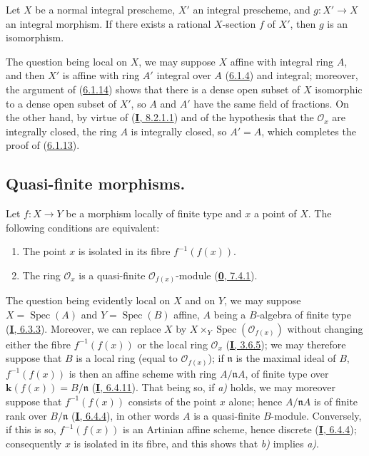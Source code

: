 \begin{corollary}[6.1.15]
\label{II.6.1.15}
Let $X$ be a normal integral prescheme, $X'$ an integral prescheme, and
$g:X'\to X$ an \textup{integral} morphism. If there exists a rational $X$-section $f$
of $X'$, then $g$ is an isomorphism.
\end{corollary}

The question being local on $X$, we may suppose $X$ affine with integral
ring $A$, and then $X'$ is affine with ring $A'$ integral over $A$
(\hyperref[II.6.1.4]{6.1.4}) and integral; moreover, the argument of
(\hyperref[II.6.1.14]{6.1.14}) shows that there is a dense open subset of
$X$ isomorphic to a dense open subset of $X'$, so $A$ and $A'$ have the same
field of fractions. On the other hand, by virtue of
(\hyperref[I.8.2.1.1]{\textbf{I}, 8.2.1.1}) and of the hypothesis that the
$\mathcal{O}_x$ are integrally closed, the ring $A$ is integrally closed,
so $A'=A$, which completes the proof of
(\hyperref[II.6.1.13]{6.1.13}).

\subsection{Quasi-finite morphisms.}
\label{subsection:II.6.2}

\begin{proposition}[6.2.1]
\label{II.6.2.1}
Let $f:X\to Y$ be a morphism locally of finite type and $x$ a point of $X$.
The following conditions are equivalent:


\begin{enumerate}
\item[\textup{a)}] The point $x$ is isolated in its fibre $f^{-1}(f(x))$.
\item[\textup{b)}] The ring $\mathcal{O}_x$ is a quasi-finite
$\mathcal{O}_{f(x)}$-module \textup{(\hyperref[0.7.4.1]{\textbf{0}, 7.4.1})}.
\end{enumerate}
\end{proposition}

The question being evidently local on $X$ and on $Y$, we may suppose
$X=\operatorname{Spec}(A)$ and $Y=\operatorname{Spec}(B)$ affine, $A$ being
a $B$-algebra of finite type (\hyperref[I.6.3.3]{\textbf{I}, 6.3.3}). Moreover, we
can replace $X$ by $X\times_Y\operatorname{Spec}(\mathcal{O}_{f(x)})$
without changing either the fibre $f^{-1}(f(x))$ or the local ring
$\mathcal{O}_x$ (\hyperref[I.3.6.5]{\textbf{I}, 3.6.5}); we may therefore suppose
that $B$ is a local ring (equal to $\mathcal{O}_{f(x)}$); if $\mathfrak{n}$
is the maximal ideal of $B$, $f^{-1}(f(x))$ is then an affine scheme with
ring $A/\mathfrak{n}A$, of finite type over $\boldsymbol{k}(f(x))=B/\mathfrak{n}$
(\hyperref[I.6.4.11]{\textbf{I}, 6.4.11}). That being so, if \emph{a)} holds, we may
moreover suppose that $f^{-1}(f(x))$ consists of the point $x$ alone; hence
$A/\mathfrak{n}A$ is of finite rank over $B/\mathfrak{n}$
(\hyperref[I.6.4.4]{\textbf{I}, 6.4.4}), in other words $A$ is a quasi-finite
$B$-module. Conversely, if this is so, $f^{-1}(f(x))$ is an Artinian affine
scheme, hence discrete (\hyperref[I.6.4.4]{\textbf{I}, 6.4.4}); consequently $x$
is isolated in its fibre, and this shows that \emph{b)} implies \emph{a)}.

